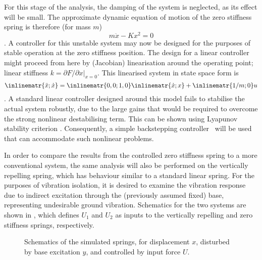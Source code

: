 For this stage of the analysis, the damping of the system is
neglected, as its effect will be small. The approximate dynamic
equation of motion of the zero stiffness spring is therefore (for
mass $m$)
\begin{dmath}[label=dynamics]
m\ddot x - K x^2 = 0
\end{dmath}.
A controller for this unstable system may now be designed for the
purposes of stable operation at the zero stiffness position. The
design for a linear controller might proceed from here by (Jacobian)
linearisation around the operating point; linear stiffness $k =
\partial F/\partial x |_{x=0}$. This linearised system in state space form is
\begin{dmath}[label=linearised-dynamics]
\inlinematr{ \ddot x ;
              \dot x } = \inlinematr{ 0 , 0 ;
                                      1 , 0 }
                         \inlinematr{ \dot x ;
                                      x      }
                       + \inlinematr{ 1/m ;
                                      0   } u
\end{dmath}.
A standard linear controller designed around this model fails to
stabilise the actual system robustly, due to the large gains that
would be required to overcome the strong nonlinear destabilising
term. This can be shown using Lyapunov stability criterion
\cite{khalil1992}. Consequently, a simple backstepping
controller~\cite{krstic1995} will be used that can accommodate such
nonlinear problems.

In order to compare the results from the controlled zero stiffness
spring to a more conventional system, the same analysis will also be
performed on the vertically repelling spring, which has behaviour
similar to a standard linear spring. For the purposes of vibration
isolation, it is desired to examine the vibration response due to
indirect excitation through the (previously assumed fixed) base,
representing undesirable ground vibration. Schematics for the two
systems are shown in , which defines $U_1$
and $U_2$ as inputs to the vertically repelling and zero stiffness
springs, respectively.

\begin{figure}
  \caption{Schematics of the simulated springs, for displacement $x$,
     disturbed by base excitation $y$, and controlled by input force $U$.}
\end{figure}

